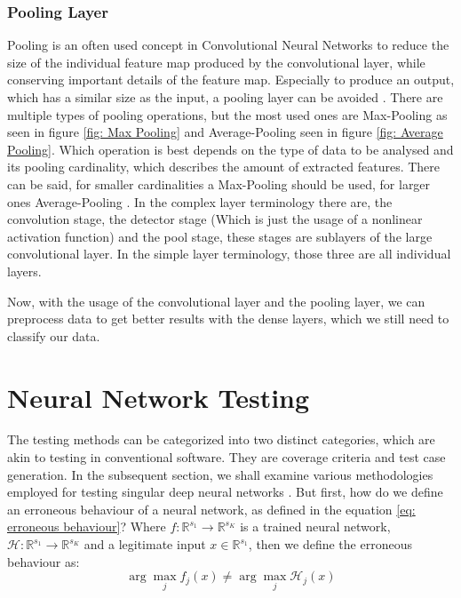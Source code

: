 \subsubsection{Pooling Layer}
Pooling is an often used concept in Convolutional Neural Networks to reduce the size of the individual feature map produced by the convolutional layer, while conserving important details of the feature map.
Especially to produce an output, which has a similar size as the input, a pooling layer can be avoided \cite{jain_supervised_2007}.
There are multiple types of pooling operations, but the most used ones are Max-Pooling as seen in figure \ref{fig: Max Pooling} and Average-Pooling seen in figure \ref{fig: Average Pooling}.
Which operation is best depends on the type of data to be analysed and its pooling cardinality, which describes the amount of extracted features.
There can be said, for smaller cardinalities a Max-Pooling should be used, for larger ones Average-Pooling \cite{boureau_theoretical_2010}.
In the complex layer terminology \cite{goodfellow_deep_2016} there are, the convolution stage, the detector stage (Which is just the usage of a nonlinear activation function) and the pool stage, these stages are sublayers of the large convolutional layer.
In the simple layer terminology, those three are all individual layers.


Now, with the usage of the convolutional layer and the pooling layer, we can preprocess data to get better results with the dense layers, which we still need to classify our data.


\section{Neural Network Testing}\label{sec:neural-network-testing}
The testing methods can be categorized into two distinct categories, which are akin to testing in conventional software.
They are coverage criteria and test case generation.
In the subsequent section, we shall examine various methodologies employed for testing singular deep neural networks \cite{huang_survey_2020}.
But first, how do we define an erroneous behaviour of a neural network, as defined in the equation \ref{eq: erroneous behaviour}?
Where $f: \mathbb{R}^{s_1} \to \mathbb{R}^{s_K}$ is a trained neural network, $\mathcal{H}: \mathbb{R}^{s_1} \to \mathbb{R}^{s_K}$ and a legitimate input $x \in \mathbb{R}^{s_1}$, then we define the erroneous behaviour as:
\begin{equation}
    \arg \max_{j} f_j (x) \neq \arg \max_{j} \mathcal{H}_j (x)
    \label{eq: erroneous behaviour}
\end{equation}

